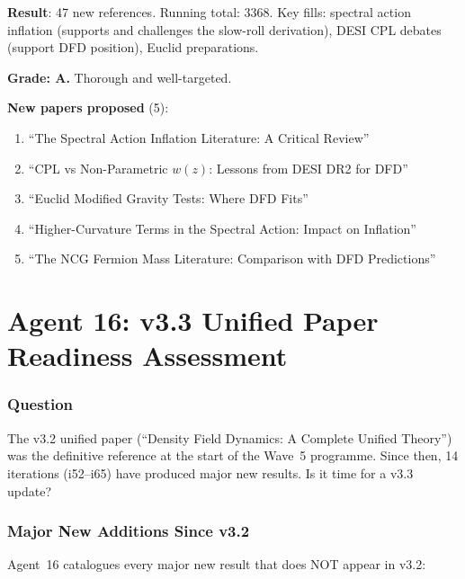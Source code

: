 \documentclass[11pt,a4paper]{article}
\begin{document}
\begin{tcolorbox}[colback=green!5!white, colframe=green!60!black, title={Agent 15: Literature Sweep COMPLETE}]
\textbf{Result}: 47 new references. Running total: 3368. Key fills: spectral action inflation (supports and challenges the slow-roll derivation), DESI CPL debates (support DFD position), Euclid preparations.

\textbf{Grade: A.} Thorough and well-targeted.

\textbf{New papers proposed} (5):
\begin{enumerate}
\item ``The Spectral Action Inflation Literature: A Critical Review''
\item ``CPL vs Non-Parametric $w(z)$: Lessons from DESI DR2 for DFD''
\item ``Euclid Modified Gravity Tests: Where DFD Fits''
\item ``Higher-Curvature Terms in the Spectral Action: Impact on Inflation''
\item ``The NCG Fermion Mass Literature: Comparison with DFD Predictions''
\end{enumerate}
\end{tcolorbox}


\part{Agent 16: v3.3 Unified Paper Readiness Assessment}
\label{part:v33-assessment}

\section{Question}

The v3.2 unified paper (``Density Field Dynamics: A Complete Unified Theory'') was the definitive reference at the start of the Wave~5 programme. Since then, 14 iterations (i52--i65) have produced major new results. Is it time for a v3.3 update?

\section{Major New Additions Since v3.2}

Agent~16 catalogues every major new result that does NOT appear in v3.2:
\end{document}
